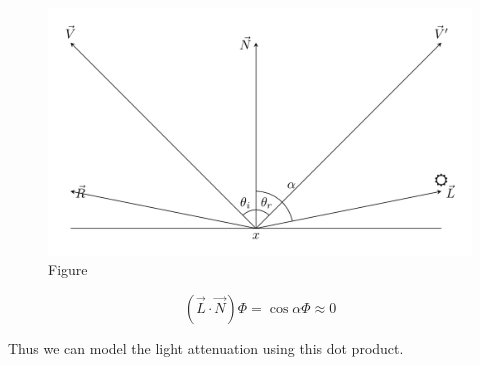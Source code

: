 \documentclass[
]{book}
\begin{document}
\begin{figure}
\centering
\includegraphics{figures/02_3.png}
\caption{Figure}
\end{figure}

\[
\left(\vec{L}\cdot\vec{N}\right)\Phi=\cos\alpha\Phi\approx 0
\]

Thus we can model the light attenuation using this dot product.

\backmatter
\end{document}
